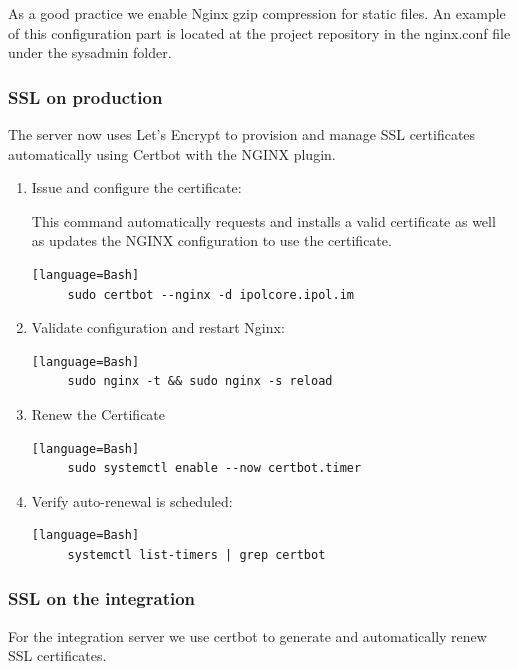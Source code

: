 \documentclass[a4paper,12pt]{article}
\begin{document}
\begin{enumerate}
\begin{enumerate}
\begin{enumerate}
    \end{enumerate}
    \end{enumerate}
\end{enumerate}

As a good practice we enable Nginx gzip compression for static files. An example of this configuration part is located at the project repository in the nginx.conf file under the sysadmin folder.

\subsubsection{SSL on production}
The server now uses Let’s Encrypt to provision and manage SSL certificates automatically using Certbot with the NGINX plugin.
\begin{enumerate}
    \item Issue and configure the certificate:
     
     This command automatically requests and installs a valid certificate as well as updates the NGINX configuration to use the certificate.
    \begin{verbatim}[language=Bash]
     sudo certbot --nginx -d ipolcore.ipol.im
    \end{verbatim}
    \item Validate configuration and restart Nginx:
    \begin{verbatim}[language=Bash]
     sudo nginx -t && sudo nginx -s reload
    \end{verbatim}
    \item Renew the Certificate
    \begin{verbatim}[language=Bash]
     sudo systemctl enable --now certbot.timer
    \end{verbatim}
    \item Verify auto-renewal is scheduled:
    \begin{verbatim}[language=Bash]
     systemctl list-timers | grep certbot
    \end{verbatim}
\end{enumerate}


\subsubsection{SSL on the integration}
For the integration server we use certbot to generate and automatically renew SSL certificates.
\end{document}
